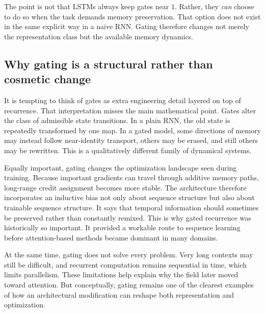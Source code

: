 \medskip

The point is not that LSTMs always keep gates near $1$.
Rather, they \emph{can} choose to do so when the task demands memory preservation.
That option does not exist in the same explicit way in a naive RNN.
Gating therefore changes not merely the representation class but the available memory dynamics.

\subsection*{Why gating is a structural rather than cosmetic change}

It is tempting to think of gates as extra engineering detail layered on top of recurrence.
That interpretation misses the main mathematical point.
Gates alter the class of admissible state transitions.
In a plain RNN, the old state is repeatedly transformed by one map.
In a gated model, some directions of memory may instead follow near-identity transport, others may be erased, and still others may be rewritten.
This is a qualitatively different family of dynamical systems.

\medskip

Equally important, gating changes the optimization landscape seen during training.
Because important gradients can travel through additive memory paths, long-range credit assignment becomes more stable.
The architecture therefore incorporates an inductive bias not only about sequence structure but also about trainable sequence structure.
It says that temporal information should sometimes be preserved rather than constantly remixed.
This is why gated recurrence was historically so important.
It provided a workable route to sequence learning before attention-based methods became dominant in many domains.

\medskip

At the same time, gating does not solve every problem.
Very long contexts may still be difficult, and recurrent computation remains sequential in time, which limits parallelism.
These limitations help explain why the field later moved toward attention.
But conceptually, gating remains one of the clearest examples of how an architectural modification can reshape both representation and optimization.


